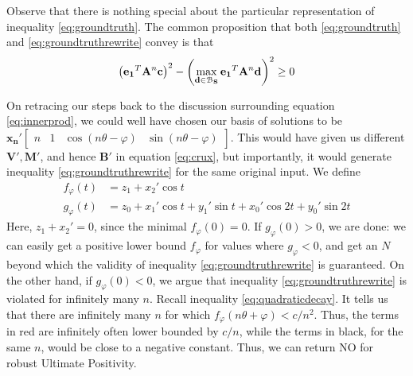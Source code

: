 Observe that there is nothing special about the particular representation of inequality \ref{eq:groundtruth}. The common proposition that both \ref{eq:groundtruth} and \ref{eq:groundtruthrewrite} convey is that 
$$
\left(\mathbf{e_1}^T\mathbf{A}^n\mathbf{c}\right)^2 - \left(\max_{\mathbf{d} \in \mathcal{B}_{\mathbf{S}}} \mathbf{e_1}^T\mathbf{A}^n\mathbf{d}\right)^2 \ge 0
$$

On retracing our steps back to the discussion surrounding equation \ref{eq:innerprod}, we could well have chosen our basis of solutions to be $\mathbf{x_n'}\begin{bmatrix}n & 1 & \cos(n\theta - \varphi) & \sin(n\theta - \varphi) \end{bmatrix}$. This would have given us different $\mathbf{V'}, \mathbf{M'}$, and hence $\mathbf{B'}$ in equation \ref{eq:crux}, but importantly, it would generate inequality \ref{eq:groundtruthrewrite} for the same original input. We define 
\begin{align}
f_\varphi(t) &= z_1 + x_2'\cos t  \\
g_\varphi(t) &= z_0 + x_1'\cos t + y_1'\sin t + x_0'\cos 2t + y_0'\sin 2t
\end{align}
Here, $z_1 + x_2' = 0$, since the minimal $f_\varphi(0) = 0$. If $g_\varphi(0) > 0$, we are done: we can easily get a positive lower bound $f_\varphi$ for values where $g_\varphi < 0$, and get an $N$ beyond which the validity of inequality \ref{eq:groundtruthrewrite} is guaranteed. On the other hand, if $g_\varphi(0) < 0$, we argue that inequality \ref{eq:groundtruthrewrite} is violated for infinitely many $n$. Recall inequality \ref{eq:quadraticdecay}. It tells us that there are infinitely many $n$ for which $f_\varphi(n\theta + \varphi) < c/n^2$. Thus, the terms in red are infinitely often lower bounded by $c/n$, while the terms in black, for the same $n$, would be close to a negative constant. Thus, we can return NO for robust Ultimate Positivity.


